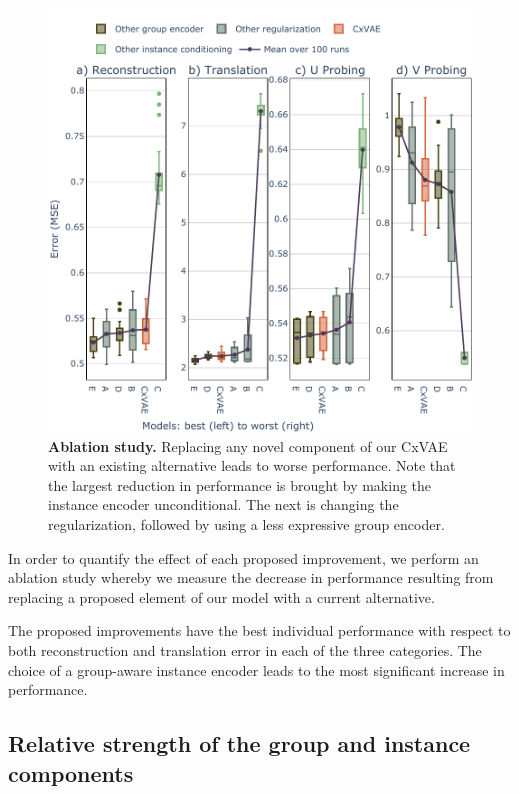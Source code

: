 \documentclass[nohyperref]{article}
\theoremstyle{plain}
\theoremstyle{definition}
\theoremstyle{remark}
\begin{document}
\begin{figure}[t]
\vskip 0.2in
\begin{center}
\centerline{\includegraphics[width=\columnwidth]{files/ablation.pdf}}
\caption{\textbf{Ablation study.} Replacing any novel component of our CxVAE with an existing alternative leads to worse performance. Note that the largest reduction in performance is brought by making the instance encoder unconditional. The next is changing the regularization, followed by using a less expressive group encoder.}
\label{ablation}
\end{center}
\vskip -0.2in
\end{figure}

In order to quantify the effect of each proposed improvement, we perform an ablation study whereby we measure the decrease in performance resulting from replacing a proposed element of our model with a current alternative.

The proposed improvements have the best individual performance with respect to both reconstruction and translation error in each of the three categories. The choice of a group-aware instance encoder leads to the most significant increase in performance.

\subsection{Relative strength of the group and instance components}
\end{document}
